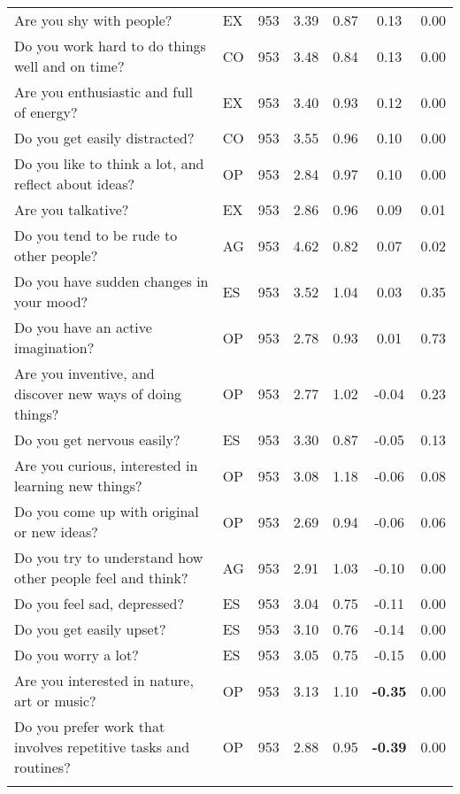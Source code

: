 \begin{table}[htbp]
{\begin{tabular}{llccccc}
    Are you shy with people? & EX    & 953   & 3.39  & 0.87  & 0.13  & 0.00 \\
    Do you work hard to do things well and on time? & CO    & 953   & 3.48  & 0.84  & 0.13  & 0.00 \\
    Are you enthusiastic and full of energy? & EX    & 953   & 3.40  & 0.93  & 0.12  & 0.00 \\
    Do you get easily distracted? & CO    & 953   & 3.55  & 0.96  & 0.10  & 0.00 \\
    Do you like to think a lot, and reflect about ideas? & OP    & 953   & 2.84  & 0.97  & 0.10  & 0.00 \\
    Are you talkative? & EX    & 953   & 2.86  & 0.96  & 0.09  & 0.01 \\
    Do you tend to be rude to other people? & AG    & 953   & 4.62  & 0.82  & 0.07  & 0.02 \\
    Do you have sudden changes in your mood? & ES    & 953   & 3.52  & 1.04  & 0.03  & 0.35 \\
    Do you have an active imagination? & OP    & 953   & 2.78  & 0.93  & 0.01  & 0.73 \\
    Are you inventive, and discover new ways of doing things? & OP    & 953   & 2.77  & 1.02  & -0.04 & 0.23 \\
    Do you get nervous easily? & ES    & 953   & 3.30  & 0.87  & -0.05 & 0.13 \\
    Are you curious, interested in learning new things? & OP    & 953   & 3.08  & 1.18  & -0.06 & 0.08 \\
    Do you come up with original or new ideas? & OP    & 953   & 2.69  & 0.94  & -0.06 & 0.06 \\
    Do you try to understand how other people feel and think? & AG    & 953   & 2.91  & 1.03  & -0.10 & 0.00 \\
    Do you feel sad, depressed? & ES    & 953   & 3.04  & 0.75  & -0.11 & 0.00 \\
    Do you get easily upset? & ES    & 953   & 3.10  & 0.76  & -0.14 & 0.00 \\
    Do you worry a lot? & ES    & 953   & 3.05  & 0.75  & -0.15 & 0.00 \\
    Are you interested in nature, art or music? & OP    & 953   & 3.13  & 1.10  & \textbf{-0.35} & 0.00 \\
    Do you prefer work that involves repetitive tasks and routines? & OP    & 953   & 2.88  & 0.95  & \textbf{-0.39} & 0.00 \\
    \bottomrule
	\Tablenote{7}{Most contributive \textbf{variables} are used to interpret factor: threshold at 0.3.} \\
    \end{tabular}%
	}
  \label{tab:factor5}%
\end{table}%
